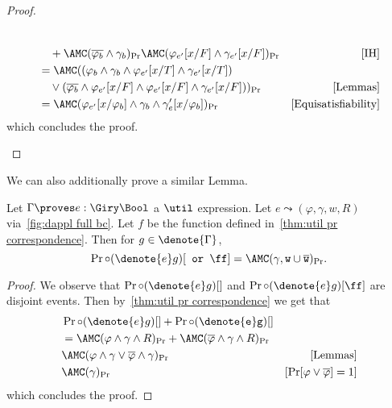 \begin{proof}
\begin{itemize}[leftmargin=*]
\begin{align*}
      &\\
      &\quad
        + \AMC(\overline{\varphi_b} \land \gamma_b)_{\Pr}
        \AMC(\varphi_{e'}[x / F] \land \gamma_{e'}[x/F])_{\Pr}
      &\text{[IH]}\\
      &= 
        \AMC((\varphi_b \land \gamma_b \land \varphi_{e'}[x / T] \land \gamma_{e'}[x/T])
      &\\
      &\quad 
          \lor 
          (\overline{\varphi_b}\land \varphi_{e'}[x / F]\land \varphi_{e'}[x / F] \land \gamma_{e'}[x/F]))_{\Pr}
      &\text{[Lemmas]}\\
      &= 
        \AMC(\varphi_{e'}[x/\varphi_b] \land \gamma_b \land \gamma_e'[x/\varphi_b])_{\Pr}
      &\text{[Equisatisfiability]}
  \end{align*}
    which concludes the proof.
  \end{itemize}
\end{proof}

We can also additionally prove a similar Lemma.

\begin{lemma}\label{lemma:util pr bot}
  Let $\Gamma \proves e : \Giry \Bool$ a $\util$ expression. Let 
  $e \leadsto (\varphi, \gamma, w, R)$ via~\cref{fig:dappl full bc}.
  Let $f$ be the function defined in~\cref{thm:util pr correspondence}. 
  Then for $g \in \denote{\Gamma}$,
  \begin{equation}
    \Pr \circ (\denote{e}g)[\tt \texttt{ or } \ff] = \AMC(\gamma, w \cup \overline w)_{\Pr}.
  \end{equation}
\end{lemma}

\begin{proof}
  We observe that $\Pr \circ (\denote{e}g)[\tt]$ 
  and $\Pr \circ (\denote{e}g)[\ff]$
  are disjoint events. Then by~\cref{thm:util pr correspondence}
  we get that 
  \begin{align*}
    &\Pr \circ (\denote{e}g)[\tt] +  \Pr \circ (\denote{e}g)[\tt]&\\
    &= \AMC(\varphi \land \gamma \land R)_{\Pr} + \AMC(\overline{\varphi} \land \gamma \land R)_{\Pr}&\\
    &\AMC(\varphi \land \gamma \lor \overline{\varphi} \land \gamma)_{\Pr}
    &\text{[Lemmas]}\\
    &\AMC(\gamma)_{\Pr}
    &[\Pr[\varphi \lor \overline{\varphi}] = 1]
  \end{align*}
  which concludes the proof.
\end{proof}

